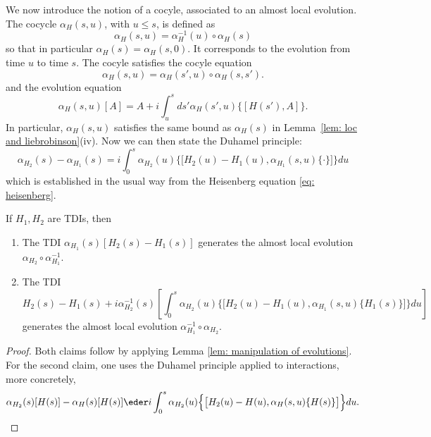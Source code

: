 We now introduce the notion of a cocyle, associated to an almost local evolution.  
The cocycle $\alpha_H(s,u)$, with $u\leq s$, is defined as
\begin{equation}\label{cocylce bis}
	\alpha_H(s,u) = \alpha_H^{-1}(u)\circ\alpha_H(s)
\end{equation}
so that in particular $\alpha_H(s)=\alpha_H(s,0)$. It corresponds to the evolution from time $u$ to time $s$. The cocyle satisfies the cocyle  equation
%
\begin{equation}\label{cocylce equation}
	\alpha_H(s,u)=    \alpha_H(s',u) \circ \alpha_H(s,s').
\end{equation}
and the evolution equation
$$
\alpha_H(s,u)[A] = A+i \int_u^s ds' \alpha_H(s',u)\{[H(s'),A]\}.
$$ 
%
%
In particular, $\alpha_H(s,u)$ satisfies the same bound as $\alpha_H(s)$ in Lemma~\ref{lem: loc and liebrobinson}(iv). Now we can then state the Duhamel principle:
%
\begin{equation}\label{Duhamel}
	\alpha_{H_2}(s)- \alpha_{H_1}(s)=  i\int_0^s \alpha_{H_2}(u)\big\{\big[H_2(u) - {H_1}(u),\alpha_{H_1}(s,u)\{\cdot\}\big]\big\}du
\end{equation}
%
which is established in the usual way from the Heisenberg equation \eqref{eq: heisenberg}. 
\begin{lemma}\label{lem: inverse small diff}
	If ${H_1},{H_2}$ are TDIs, then 
	\begin{enumerate}
		\item The TDI  $\alpha_{{H_1}}(s)[{H_2}(s)-{H_1}(s)]$ generates the almost local evolution $ \alpha_{{H_2}}\circ\alpha_{{H_1}}^{-1}$.
		\item The TDI 
		\begin{equation}
			\label{Difference}
			{H_2}(s)-{H_1}(s)+ i \alpha_{H_2}^{-1}(s)\left[\int_0^s \alpha_{{H_2}}(u)\Big\{\big[{H_2}(u) - H_1(u),\alpha_{H_1}(s,u)\{H_1(s)\}\big]\Big\}du \right]
		\end{equation}
		generates the almost local evolution $\alpha_{{H_1}}^{-1}\circ\alpha_{{H_2}}$. 
	\end{enumerate}
\end{lemma}
\begin{proof}
	Both claims follow by applying Lemma \ref{lem: manipulation of evolutions}. For the second claim, one uses the Duhamel principle applied to interactions, more concretely,
	\begin{equation} \label{eq: duhamel}
		\alpha_{{H_2}}(s)[H(s)] - \alpha_H(s)[H(s)] \eder i\int_0^s \alpha_{{H_2}}(u)\Big\{\big[{H_2}(u) - H(u),\alpha_{H}(s,u)\{{H}(s)\}\big]\Big\}du.
	\end{equation}
\end{proof}




